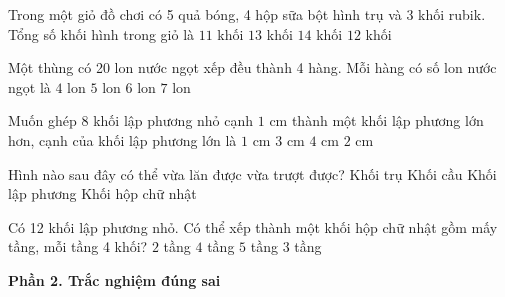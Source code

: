 \begin{ex} %
Trong một giỏ đồ chơi có 5 quả bóng, 4 hộp sữa bột hình trụ và 3 khối rubik. Tổng số khối hình trong giỏ là
\choice
{$11$ khối}
{$13$ khối}
{$14$ khối}
{\True $12$ khối}
\end{ex}

\begin{ex} %
Một thùng có 20 lon nước ngọt xếp đều thành 4 hàng. Mỗi hàng có số lon nước ngọt là
\choice
{$4$ lon}
{\True $5$ lon}
{$6$ lon}
{$7$ lon}
\end{ex}

\begin{ex} %
Muốn ghép 8 khối lập phương nhỏ cạnh $1\text{ cm}$ thành một khối lập phương lớn hơn, cạnh của khối lập phương lớn là
\choice
{$1\text{ cm}$}
{$3\text{ cm}$}
{$4\text{ cm}$}
{\True $2\text{ cm}$}
\end{ex}

\begin{ex} %
Hình nào sau đây có thể vừa lăn được vừa trượt được?
\choice
{\True Khối trụ}
{Khối cầu}
{Khối lập phương}
{Khối hộp chữ nhật}
\end{ex}

\begin{ex} %
Có 12 khối lập phương nhỏ. Có thể xếp thành một khối hộp chữ nhật gồm mấy tầng, mỗi tầng 4 khối?
\choice
{$2$ tầng}
{$4$ tầng}
{$5$ tầng}
{\True $3$ tầng}
\end{ex}

\textbf{Phần 2. Trắc nghiệm đúng sai}

